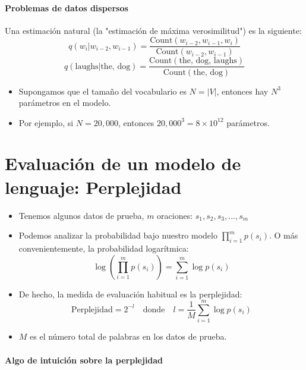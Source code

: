 \paragraph{Problemas de datos dispersos}

Una estimación natural (la "estimación de máxima verosimilitud") es la siguiente:
\[
q(w_i | w_{i-2}, w_{i-1}) = \frac{{\text{Count}(w_{i-2}, w_{i-1}, w_i)}}{{\text{Count}(w_{i-2}, w_{i-1})}}
\]
\[
q(\text{laughs} | \text{the, dog}) = \frac{{\text{Count}(\text{the, dog, laughs})}}{{\text{Count}(\text{the, dog})}}
\]
\begin{itemize}
    \item Supongamos que el tamaño del vocabulario es $N = |V|$, entonces hay $N^3$ parámetros en el modelo.
    \item Por ejemplo, si $N = 20,000$, entonces $20,000^3 = 8 \times 10^{12}$ parámetros.
\end{itemize}

\section{Evaluación de un modelo de lenguaje: Perplejidad}

\begin{itemize}
    \item Tenemos algunos datos de prueba, $m$ oraciones: $s_1, s_2, s_3, ..., s_m$
    \item Podemos analizar la probabilidad bajo nuestro modelo $\prod_{i=1}^{m} p(s_i)$. O más convenientemente, la probabilidad logarítmica:
    \[
        \log \left( \prod_{i=1}^{m} p(s_i) \right) = \sum_{i=1}^{m} \log p(s_i)
    \]
    \item De hecho, la medida de evaluación habitual es la perplejidad:
    \[
        \text{Perplejidad} = 2^{-l} \quad \text{donde} \quad l = \frac{1}{M} \sum_{i=1}^{m} \log p(s_i)
    \]
    \item $M$ es el número total de palabras en los datos de prueba.
\end{itemize}

\paragraph{Algo de intuición sobre la perplejidad}

